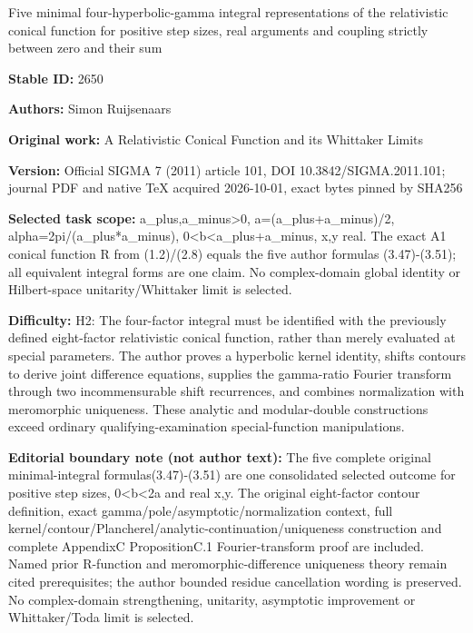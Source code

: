 \documentclass[11pt]{article}
\numberwithin{equation}{section}
\begin{document}
\begin{center}\Large Five minimal four-hyperbolic-gamma integral representations of the relativistic conical function for positive step sizes, real arguments and coupling strictly between zero and their sum\end{center}
\noindent\textbf{Stable ID:} 2650\par
\noindent\textbf{Authors:} Simon Ruijsenaars\par
\noindent\textbf{Original work:} A Relativistic Conical Function and its Whittaker Limits\par
\noindent\textbf{Version:} Official SIGMA 7 (2011) article 101, DOI 10.3842/SIGMA.2011.101; journal PDF and native TeX acquired 2026-10-01, exact bytes pinned by SHA256\par
\noindent\textbf{Selected task scope:} a\_plus,a\_minus>0, a=\allowbreak{}(a\_plus+\allowbreak{}a\_minus)/2, alpha=\allowbreak{}2pi/(a\_plus*\allowbreak{}a\_minus), 0<b<a\_plus+\allowbreak{}a\_minus, x,y real. The exact A1 conical function R from (1.2)/(2.8) equals the five author formulas (3.47)-(3.51); all equivalent integral forms are one claim. No complex-domain global identity or Hilbert-space unitarity/Whittaker limit is selected.\par
\noindent\textbf{Difficulty:} H2: The four-factor integral must be identified with the previously defined eight-factor relativistic conical function, rather than merely evaluated at special parameters. The author proves a hyperbolic kernel identity, shifts contours to derive joint difference equations, supplies the gamma-ratio Fourier transform through two incommensurable shift recurrences, and combines normalization with meromorphic uniqueness. These analytic and modular-double constructions exceed ordinary qualifying-examination special-function manipulations.\par
\noindent\textbf{Editorial boundary note (not author text):} The five complete original minimal-integral formulas(3.47)-(3.51) are one consolidated selected outcome for positive step sizes, 0<b<2a and real x,y. The original eight-factor contour definition, exact gamma/pole/asymptotic/normalization context, full kernel/contour/Plancherel/analytic-continuation/uniqueness construction and complete AppendixC PropositionC.1 Fourier-transform proof are included. Named prior R-function and meromorphic-difference uniqueness theory remain cited prerequisites; the author bounded residue cancellation wording is preserved. No complex-domain strengthening, unitarity, asymptotic improvement or Whittaker/Toda limit is selected.\par
\end{document}
